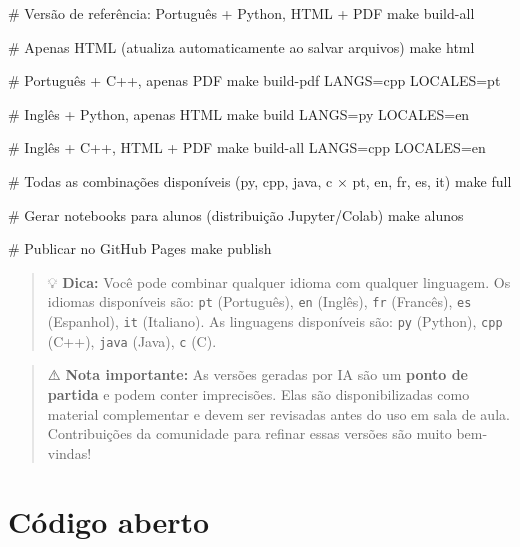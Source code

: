 \documentclass[
  portuguese,
  letterpaper,
  openany,
  oneside,
  12pt,
  a4paper]{book}
\newenvironment{Shaded}{\begin{snugshade}}{\end{snugshade}}
\newcommand{\CommentTok}[1]{\textcolor[rgb]{0.37,0.37,0.37}{#1}}
\newcommand{\FunctionTok}[1]{\textcolor[rgb]{0.28,0.35,0.67}{#1}}
\newcommand{\NormalTok}[1]{\textcolor[rgb]{0.00,0.23,0.31}{#1}}
\begin{document}
\begin{Shaded}
\begin{Highlighting}[]
\CommentTok{\# Versão de referência: Português + Python, HTML + PDF}
\FunctionTok{make}\NormalTok{ build{-}all}

\CommentTok{\# Apenas HTML (atualiza automaticamente ao salvar arquivos)}
\FunctionTok{make}\NormalTok{ html}

\CommentTok{\# Português + C++, apenas PDF}
\FunctionTok{make}\NormalTok{ build{-}pdf LANGS=cpp LOCALES=pt}

\CommentTok{\# Inglês + Python, apenas HTML}
\FunctionTok{make}\NormalTok{ build LANGS=py LOCALES=en}

\CommentTok{\# Inglês + C++, HTML + PDF}
\FunctionTok{make}\NormalTok{ build{-}all LANGS=cpp LOCALES=en}

\CommentTok{\# Todas as combinações disponíveis (py, cpp, java, c × pt, en, fr, es, it)}
\FunctionTok{make}\NormalTok{ full}

\CommentTok{\# Gerar notebooks para alunos (distribuição Jupyter/Colab)}
\FunctionTok{make}\NormalTok{ alunos}

\CommentTok{\# Publicar no GitHub Pages}
\FunctionTok{make}\NormalTok{ publish}
\end{Highlighting}
\end{Shaded}

\begin{quote}
💡 \textbf{Dica:} Você pode combinar qualquer idioma com qualquer
linguagem. Os idiomas disponíveis são: \texttt{pt} (Português),
\texttt{en} (Inglês), \texttt{fr} (Francês), \texttt{es} (Espanhol),
\texttt{it} (Italiano). As linguagens disponíveis são: \texttt{py}
(Python), \texttt{cpp} (C++), \texttt{java} (Java), \texttt{c} (C).
\end{quote}

\begin{quote}
⚠️ \textbf{Nota importante:} As versões geradas por IA são um
\textbf{ponto de partida} e podem conter imprecisões. Elas são
disponibilizadas como material complementar e devem ser revisadas antes
do uso em sala de aula. Contribuições da comunidade para refinar essas
versões são muito bem-vindas!
\end{quote}

\section*{Código aberto}\label{cuxf3digo-aberto}
\end{document}
